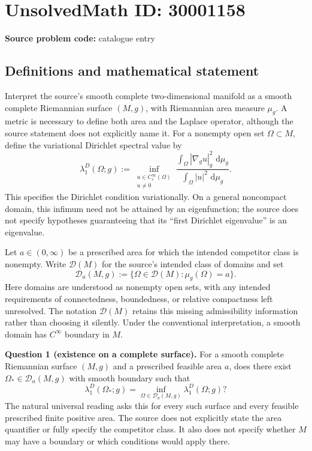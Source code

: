 \documentclass[11pt]{article}
\newcommand{\dd}{\,\mathrm{d}}
\begin{document}
\section*{UnsolvedMath ID: 30001158}
\textbf{Source problem code:} catalogue entry
\subsection{Definitions and mathematical statement}
Interpret the source's smooth complete two-dimensional manifold as a smooth complete Riemannian surface $(M,g)$, with Riemannian area measure $\mu_g$. A metric is necessary to define both area and the Laplace operator, although the source statement does not explicitly name it. For a nonempty open set $\Omega\subset M$, define the variational Dirichlet spectral value by
\[
\lambda_1^D(\Omega;g)
:=\inf_{\substack{u\in C_c^\infty(\Omega)\\u\ne0}}
\frac{\displaystyle\int_\Omega |\nabla_g u|_g^2\,\dd\mu_g}
{\displaystyle\int_\Omega |u|^2\,\dd\mu_g}.
\]
This specifies the Dirichlet condition variationally. On a general noncompact domain, this infimum need not be attained by an eigenfunction; the source does not specify hypotheses guaranteeing that its ``first Dirichlet eigenvalue'' is an eigenvalue.

Let $a\in(0,\infty)$ be a prescribed area for which the intended competitor class is nonempty. Write $\mathcal D(M)$ for the source's intended class of domains and set
\[
\mathcal D_a(M,g):=\{\Omega\in\mathcal D(M):\mu_g(\Omega)=a\}.
\]
Here domains are understood as nonempty open sets, with any intended requirements of connectedness, boundedness, or relative compactness left unresolved. The notation $\mathcal D(M)$ retains this missing admissibility information rather than choosing it silently. Under the conventional interpretation, a smooth domain has $C^\infty$ boundary in $M$.

\textbf{Question 1 (existence on a complete surface).} For a smooth complete Riemannian surface $(M,g)$ and a prescribed feasible area $a$, does there exist $\Omega_*\in\mathcal D_a(M,g)$ with smooth boundary such that
\[
\lambda_1^D(\Omega_*;g)
=\inf_{\Omega\in\mathcal D_a(M,g)}\lambda_1^D(\Omega;g)?
\]
The natural universal reading asks this for every such surface and every feasible prescribed finite positive area. The source does not explicitly state the area quantifier or fully specify the competitor class. It also does not specify whether $M$ may have a boundary or which conditions would apply there.
\end{document}
